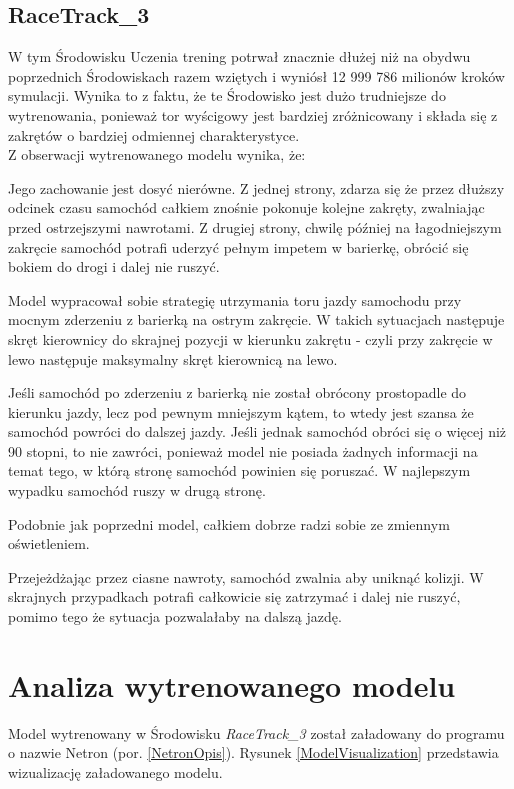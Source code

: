 \subsection{RaceTrack\_3}
W tym Środowisku Uczenia trening potrwał znacznie dłużej niż na obydwu poprzednich Środowiskach razem wziętych i wyniósł 12 999 786 milionów kroków symulacji. Wynika to z faktu, że te Środowisko jest dużo trudniejsze do wytrenowania, ponieważ tor wyścigowy jest bardziej zróżnicowany i składa się z zakrętów o bardziej odmiennej charakterystyce. \\
Z obserwacji wytrenowanego modelu wynika, że:
\begin{enumerate*}
\item Jego zachowanie jest dosyć nierówne. Z jednej strony, zdarza się że przez dłuższy odcinek czasu samochód całkiem znośnie pokonuje kolejne zakręty, zwalniając przed ostrzejszymi nawrotami. Z drugiej strony, chwilę później na łagodniejszym zakręcie samochód potrafi uderzyć pełnym impetem w barierkę, obrócić się bokiem do drogi i dalej nie ruszyć.
\item Model wypracował sobie strategię utrzymania toru jazdy samochodu przy mocnym zderzeniu z barierką na ostrym zakręcie. W takich sytuacjach następuje skręt kierownicy do skrajnej pozycji w kierunku zakrętu - czyli przy zakręcie w lewo następuje maksymalny skręt kierownicą na lewo.
\item Jeśli samochód po zderzeniu z barierką nie został obrócony prostopadle do kierunku jazdy, lecz pod pewnym mniejszym kątem, to wtedy jest szansa że samochód powróci do dalszej jazdy. Jeśli jednak samochód obróci się o więcej niż 90 stopni, to nie zawróci, ponieważ model nie posiada żadnych informacji na temat tego, w którą stronę samochód powinien się poruszać. W najlepszym wypadku samochód ruszy w drugą stronę.
\item Podobnie jak poprzedni model, całkiem dobrze radzi sobie ze zmiennym oświetleniem.
\item Przejeżdżając przez ciasne nawroty, samochód zwalnia aby uniknąć kolizji. W skrajnych przypadkach potrafi całkowicie się zatrzymać i dalej nie ruszyć, pomimo tego że sytuacja pozwalałaby na dalszą jazdę.
\end{enumerate*}

\clearpage
\section{Analiza wytrenowanego modelu}
Model wytrenowany w Środowisku \textit{RaceTrack\_3} został załadowany do programu o nazwie Netron (por. \ref{NetronOpis}). Rysunek \ref{ModelVisualization} przedstawia wizualizację załadowanego modelu. \\

